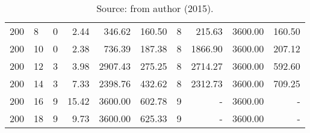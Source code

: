 \begin{appendices}
\begin{table*}[h]
\begin{center}
\begin{tabular} {l l | r r r r | r r r r}
200 & 8                                 &  0           &  2.44        &  346.62      & 160.50          &  8            &  215.63      & 3600.00      & 160.50      \\ 
200 & 10                                &  0           &  2.38        &  736.39      & 187.38          &  8            &  1866.90     & 3600.00      & 207.12      \\ 
200 & 12                                &  3           &  3.98        &  2907.43     & 275.25          &  8            &  2714.27     & 3600.00      & 592.60      \\ 
200 & 14                                &  3           &  7.33        &  2398.76     & 432.62          &  8            &  2312.73     & 3600.00      & 709.25      \\ 
200 & 16                                &  9           &  15.42       &  3600.00     & 602.78          &  9            &  -           & 3600.00      & -           \\ 
200 & 18                                &  9           &  9.73        &  3600.00     & 625.33          &  9            &  -           & 3600.00      & -           \\
\hline
\end{tabular}\caption*{Source: from author (2015).}
\end{center}
\end{table*}


\end{appendices}
